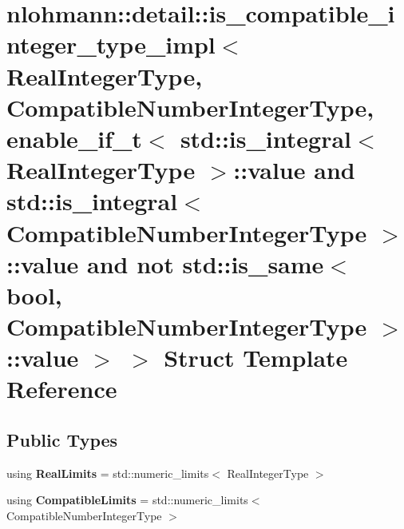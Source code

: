 \hypertarget{structnlohmann_1_1detail_1_1is__compatible__integer__type__impl_3_01RealIntegerType_00_01Compati3a04243716e8bda67d1ff2aead18da88}{}\section{nlohmann\+:\+:detail\+:\+:is\+\_\+compatible\+\_\+integer\+\_\+type\+\_\+impl$<$ Real\+Integer\+Type, Compatible\+Number\+Integer\+Type, enable\+\_\+if\+\_\+t$<$ std\+:\+:is\+\_\+integral$<$ Real\+Integer\+Type $>$\+:\+:value and std\+:\+:is\+\_\+integral$<$ Compatible\+Number\+Integer\+Type $>$\+:\+:value and not std\+:\+:is\+\_\+same$<$ bool, Compatible\+Number\+Integer\+Type $>$\+:\+:value $>$ $>$ Struct Template Reference}
\label{structnlohmann_1_1detail_1_1is__compatible__integer__type__impl_3_01RealIntegerType_00_01Compati3a04243716e8bda67d1ff2aead18da88}
\subsection*{Public Types}
\begin{DoxyCompactItemize}
\item 
\mbox{\label{structnlohmann_1_1detail_1_1is__compatible__integer__type__impl_3_01RealIntegerType_00_01Compati3a04243716e8bda67d1ff2aead18da88_a0e9f2586c4de25750563770c9388ab9f}} 
using {\bfseries Real\+Limits} = std\+::numeric\+\_\+limits$<$ Real\+Integer\+Type $>$
\item 
\mbox{\label{structnlohmann_1_1detail_1_1is__compatible__integer__type__impl_3_01RealIntegerType_00_01Compati3a04243716e8bda67d1ff2aead18da88_a002983b5c7c0f72b89d2151a6b39627d}} 
using {\bfseries Compatible\+Limits} = std\+::numeric\+\_\+limits$<$ Compatible\+Number\+Integer\+Type $>$
\end{DoxyCompactItemize}
